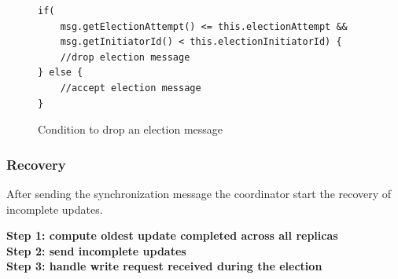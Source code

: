 \documentclass[a4paper]{article}
\begin{document}
                \begin{figure}[H]
                    \begin{verbatim}
if(
    msg.getElectionAttempt() <= this.electionAttempt &&
    msg.getInitiatorId() < this.electionInitiatorId) {
    //drop election message
} else { 
    //accept election message
}
                    \end{verbatim}
                    \caption{Condition to drop an election message}
                    \label{code:electioncondition}
                \end{figure}
        \subsubsection{Recovery} \label{subsec:recovery}
            After sending the synchronization message the coordinator start the recovery of incomplete updates.

            \begin{algorithm}[H]   
                \textbf{Step 1: compute oldest update completed across all replicas}\\
                \BlankLine
                \textbf{Step 2: send incomplete updates}\\
                \BlankLine
                \textbf{Step 3: handle write request received during the election}\\
            \end{algorithm}
\end{document}
